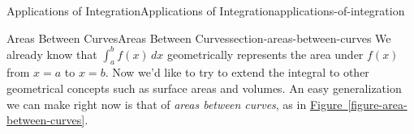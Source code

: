 \documentclass[oneside,10pt,]{book}
\numberwithin{equation}{section}
\begin{document}
%
%
\typeout{************************************************}
\typeout{************************************************}
%
\begin{chapterptx}{Applications of Integration}{}{Applications of Integration}{}{}{applications-of-integration}
%
%
\typeout{************************************************}
\typeout{************************************************}
%
\begin{sectionptx}{Areas Between Curves}{}{Areas Between Curves}{}{}{section-areas-between-curves}
\hypertarget{p-613}{}%
We already know that \(\int_{a}^{b}f(x)\,dx\) geometrically represents the area under \(f(x)\) from \(x = a\) to \(x = b\). Now we'd like to try to extend the integral to other geometrical concepts such as surface areas and volumes. An easy generalization we can make right now is that of \emph{areas between curves}, as in \hyperref[figure-area-between-curves]{Figure~\ref{figure-area-between-curves}}.%
\begin{figure}
\centering
{
}
\end{figure}
\end{sectionptx}
\end{chapterptx}
\end{document}
